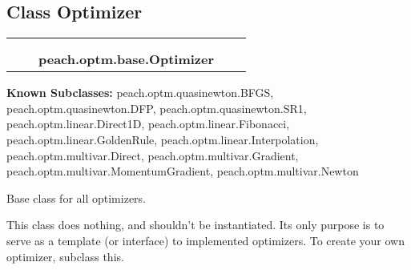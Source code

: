 \subsection{Class Optimizer}

    \label{peach:optm:base:Optimizer}
\begin{tabular}{cccccc}
\multicolumn{2}{r}{\settowidth{\BCL}{object}\multirow{2}{\BCL}{object}}
&&
  \\\cline{3-3}
  &&\multicolumn{1}{c|}{}
&&
  \\
&&\multicolumn{2}{l}{\textbf{peach.optm.base.Optimizer}}
\end{tabular}

\textbf{Known Subclasses:}
peach.optm.quasinewton.BFGS,
    peach.optm.quasinewton.DFP,
    peach.optm.quasinewton.SR1,
    peach.optm.linear.Direct1D,
    peach.optm.linear.Fibonacci,
    peach.optm.linear.GoldenRule,
    peach.optm.linear.Interpolation,
    peach.optm.multivar.Direct,
    peach.optm.multivar.Gradient,
    peach.optm.multivar.MomentumGradient,
    peach.optm.multivar.Newton


Base class for all optimizers.

This class does nothing, and shouldn't be instantiated. Its only purpose is
to serve as a template (or interface) to implemented optimizers. To create
your own optimizer, subclass this.

